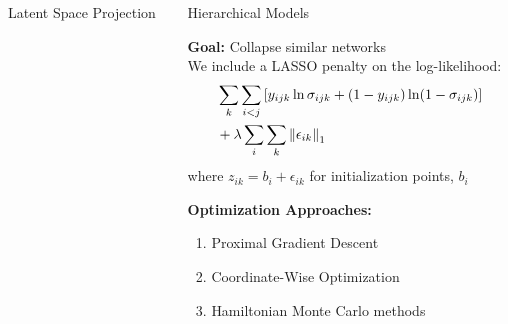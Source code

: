 \documentclass[final]{beamer}
\newlength{\onecolwid}
\newlength{\twocolwid}
\begin{document}
\begin{frame}[t]
\begin{columns}[t]
\begin{column}{\twocolwid}
\begin{columns}[t,totalwidth=\twocolwid]
\begin{column}{\onecolwid}
\begin{block}{Latent Space Projection}

\end{block}


\end{column} %

\begin{column}{\onecolwid}\vspace{-.6in} %


  \begin{block}{Hierarchical Models}

    \textbf{Goal:} Collapse similar networks\\
    We include a LASSO penalty on the log-likelihood:
    \begin{align*}
    & \sum_k\sum_{i<j} \left[y_{ijk} \ln \sigma_{ijk} + (1-y_{ijk})\ln (1-\sigma_{ijk})\right] \\
    & +\lambda\sum_i \sum_k \left\|\epsilon_{ik}\right\|_1
    \end{align*}
  where $z_{ik} = b_i + \epsilon_{ik}$ for initialization points, $b_i$


\textbf{Optimization Approaches:}
\begin{enumerate}
\item Proximal Gradient Descent
\item Coordinate-Wise Optimization
\item Hamiltonian Monte Carlo methods
\end{enumerate}



\end{block}
\end{column}
\end{columns}
\end{column}
\end{columns}
\end{frame}
\end{document}
